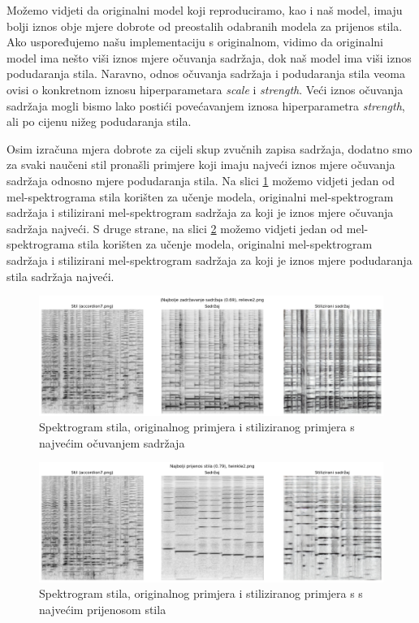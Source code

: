 Možemo vidjeti da originalni model koji reproduciramo\cite{huang2024musicstyletransferdiffusion}, kao i naš model, imaju bolji iznos obje mjere dobrote od preostalih odabranih modela za prijenos stila. Ako uspoređujemo našu implementaciju s originalnom, vidimo da originalni model ima nešto viši iznos mjere očuvanja sadržaja, dok naš model ima viši iznos podudaranja stila. Naravno, odnos očuvanja sadržaja i podudaranja stila veoma ovisi o konkretnom iznosu hiperparametara \textit{scale} i \textit{strength}. Veći iznos očuvanja sadržaja mogli bismo lako postići povećavanjem iznosa hiperparametra \textit{strength}, ali po cijenu nižeg podudaranja stila.

Osim izračuna mjera dobrote za cijeli skup zvučnih zapisa sadržaja, dodatno smo za svaki naučeni stil pronašli primjere koji imaju najveći iznos mjere očuvanja sadržaja odnosno mjere podudaranja stila. Na slici \ref{fig:cp_comp} možemo vidjeti jedan od mel-spektrograma stila korišten za učenje modela, originalni mel-spektrogram sadržaja i stilizirani mel-spektrogram sadržaja za koji je iznos mjere očuvanja sadržaja najveći. S druge strane, na slici \ref{fig:sf_comp} možemo vidjeti jedan od mel-spektrograma stila korišten za učenje modela, originalni mel-spektrogram sadržaja i stilizirani mel-spektrogram sadržaja za koji je iznos mjere podudaranja stila sadržaja najveći.

\begin{figure}
    \centering
    \includegraphics[width=0.75\linewidth]{imgs/najboljisadrzaj.png}
    \caption{Spektrogram stila, originalnog primjera i stiliziranog primjera s najvećim očuvanjem sadržaja}
    \label{fig:cp_comp}
\end{figure}


\begin{figure}[H]
    \centering
    \includegraphics[width=0.75\linewidth]{imgs/najboljistil.png}
    \caption{Spektrogram stila, originalnog primjera i stiliziranog primjera s s najvećim prijenosom stila}
    \label{fig:sf_comp}
\end{figure}